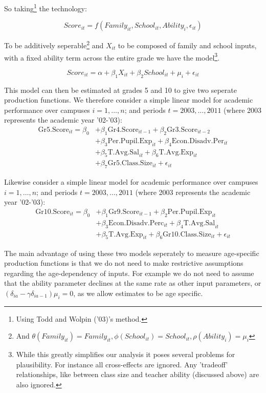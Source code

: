 \documentclass[11pt]{article}
\begin{document}
So taking\footnote{Using Todd and Wolpin ('03)'s method. } the technology: 

$$Score_{it} = f(Family_{it},School_{it},Ability_{i},\epsilon_{it})$$

To be additively seperable\footnote{And $\theta(Family_{it})=Family_{it}, \phi(School_{it})=School_{it}, \rho(Ability_{i})=\mu_{i}$ } and $X_{it}$ to be composed of family and school inputs, with a fixed ability term across the entire grade we have the model\footnote{While this greatly simplifies our analysis it poses several problems for plausibility. For instance all cross-effects are ignored. Any 'tradeoff' relationships, like between class size and teacher ability (discussed above) are also ignored.}.

$$Score_{it} = \alpha+ \beta_{1}X_{it}+\beta_{2}School_{it}+\mu_{i}+\epsilon_{it}$$

This model can then be estimated at grades 5 and 10 to give two seperate production functions. We therefore consider a simple linear model for academic performance over campuses $i=1,\ldots,n$; and periods $t=2003,\ldots,2011$ (where 2003 represents the academic year '02-'03):
\begin{align*}
\mathrm{Gr5.Score}_{it} = \beta_{0} 
    &+ \beta_{1}  \mathrm{Gr4.Score}_{it-1} 
    + \beta_{2}  \mathrm{Gr3.Score}_{it-2}    \\
    &+ \beta_{3}  \mathrm{Per.Pupil.Exp}_{it} 
    + \beta_{4}  \mathrm{Econ.Disadv.Per}_{it} \\
    &+ \beta_{5}  \mathrm{T.Avg.Sal}_{it}   
    + \beta_{6}  \mathrm{T.Avg.Exp}_{it}  \\
    &+ \beta_{7}  \mathrm{Gr5.Class.Size}_{it} + \epsilon_{it}
\end{align*}

Likewise consider a simple linear model for academic performance over campuses $i=1,\ldots,n$; and periods $t=2003,\ldots,2011$ (where 2003 represents the academic year '02-'03):
\begin{align*}
\mathrm{Gr10.Score}_{it} = \beta_{0} 
    &+ \beta_{1}  \mathrm{Gr9.Score}_{it-1} 
    + \beta_{2}  \mathrm{Per.Pupil.Exp}_{it} \\
    &+ \beta_{3}  \mathrm{Econ.Disadv.Perc}_{it} 
    + \beta_{4}  \mathrm{T.Avg.Sal}_{it}  \\
    &+ \beta_{5}  \mathrm{T.Avg.Exp}_{it}  
    + \beta_{6}  \mathrm{Gr10.Class.Size}_{it} + \epsilon_{it}
\end{align*}

The main advantage of using these two models seperately to measure age-specific production functions is that we do not need to make restrictive assumptions regarding the age-dependency of inputs. For example we do not need to assume that the ability parameter declines at the same rate as other input parameters, or $(\delta_{ia}-\gamma\delta_{ia-1})\mu_{i}=0$, as we allow estimates to be age specific. 
\end{document}
